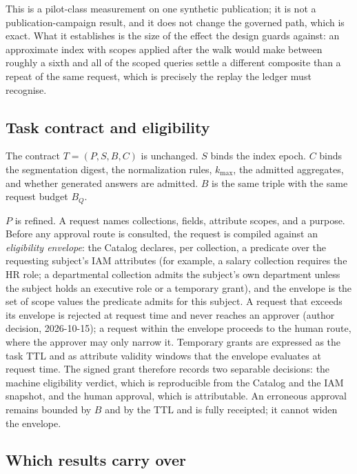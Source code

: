 \documentclass[journal,onecolumn]{IEEEtran}
\begin{document}
This is a pilot-class measurement on one synthetic publication; it is not a
publication-campaign result, and it does not change the governed path, which
is exact. What it establishes is the size of the effect the design guards
against: an approximate index with scopes applied after the walk would make
between roughly a sixth and all of the scoped queries settle a different
composite than a repeat of the same request, which is precisely the replay
the ledger must recognise.

\subsection{Task contract and eligibility}

The contract $T=(P,S,B,C)$ is unchanged. $S$ binds the index epoch. $C$
binds the segmentation digest, the normalization rules, $k_{\max}$, the
admitted aggregates, and whether generated answers are admitted. $B$ is the
same triple with the same request budget $B_Q$.

$P$ is refined. A request names collections, fields, attribute scopes, and a
purpose. Before any approval route is consulted, the request is compiled
against an \emph{eligibility envelope}: the Catalog declares, per collection,
a predicate over the requesting subject's IAM attributes (for example, a
salary collection requires the HR role; a departmental collection admits the
subject's own department unless the subject holds an executive role or a
temporary grant), and the envelope is the set of scope values the predicate
admits for this subject. A request that exceeds its envelope is rejected at
request time and never reaches an approver (author decision, 2026-10-15); a
request within the envelope proceeds to the human route, where the approver
may only narrow it. Temporary grants are expressed as the task TTL and as
attribute validity windows that the envelope evaluates at request time.
The signed grant therefore records two separable decisions: the machine
eligibility verdict, which is reproducible from the Catalog and the IAM
snapshot, and the human approval, which is attributable. An erroneous
approval remains bounded by $B$ and by the TTL and is fully receipted; it
cannot widen the envelope.

\subsection{Which results carry over}
\end{document}
